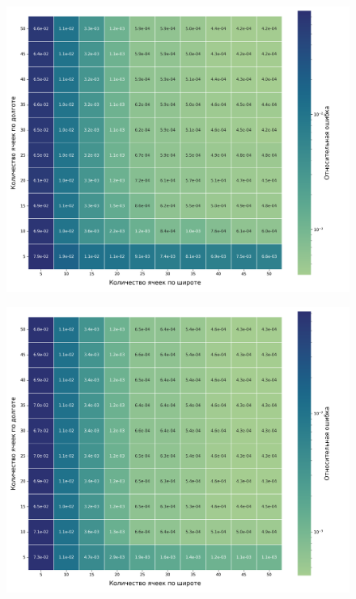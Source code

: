 \begin{figure}[h!]
    \centering
    \includegraphics[width=0.85\linewidth]{../images/solution/atmo/2357_heatmap.png}
    \label{fig:atmo:2357_heatmap}
 \end{figure}

 \begin{figure}[h!]
    \centering
    \includegraphics[width=0.85\linewidth]{../images/solution/atmo/2375_heatmap.png}
    \label{fig:atmo:2375_heatmap}
 \end{figure}

